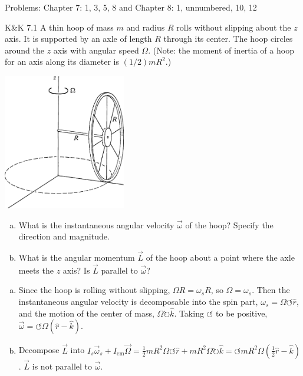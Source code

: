 \documentclass{esg8012pset}
\date{Month Day\csname latex@error\endcsname{Date not yet decided}}
\begin{document}
\noindent Problems: Chapter 7: 1, 3, 5, 8 and Chapter 8: 1, unnumbered, 10, 12

\begin{problem}{K\&K 7.1}
  A thin hoop of mass $m$ and radius $R$ rolls without slipping about the $z$ axis. It is supported by an axle of length $R$ through its center. The hoop circles around the $z$ axis with angular speed $\Omega$. (Note: the moment of inertia of a hoop for an axis along its diameter is $(1 / 2)mR^2$.)
  \begin{center}\includegraphics[width=0.4\textwidth]{ps11_1}\end{center}
  \begin{enumerate}[(a)]
    \item What is the instantaneous angular velocity $\vec \omega$ of the hoop? Specify the direction and magnitude.
    \item What is the angular momentum $\vec L$ of the hoop about a point where the axle meets the $z$ axis? Is $\vec L$ parallel to $\vec \omega$?
  \end{enumerate}
\end{problem}
\begin{solution}
\begin{enumerate}[(a)]
  \item Since the hoop is rolling without slipping, $\Omega R = \omega_s R$, so $\Omega = \omega_s$.  Then the instantaneous angular velocity is decomposable into the spin part, $\omega_s = \Omega \leftturn \hat r$, and the motion of the center of mass, $\Omega \rightturn\hat k$.  Taking $\leftturn$ to be positive, $\vec \omega = \leftturn\Omega(\hat r - \hat k)$.
  \item Decompose $\vec L$ into $I_s \vec \omega_s + I_\text{cm} \vec \Omega = \frac{1}{2} m R^2 \Omega \leftturn \hat r + m R^2 \Omega\rightturn \hat k = \leftturn mR^2 \Omega\left(\frac12 \hat r - \hat k\right)$.  $\vec L$ is not parallel to $\vec \omega$.
\end{enumerate}
\end{solution}
\end{document}
